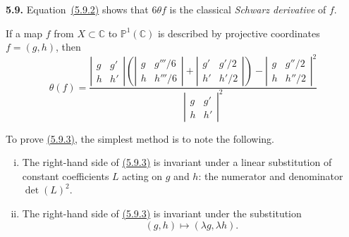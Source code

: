 \documentclass{report}
\newenvironment{rmenv}[1]
  {\phantomsection\par\medskip\noindent\textbf{#1.}\rmfamily}
  {\medskip}
\newcommand{\PP}{\mathbb{P}}
\newcommand{\CC}{\mathbb{C}}
\newcommand{\oldpage}[1]{\marginpar{\footnotesize$\Big\vert$ \textit{p.~#1}}}
\begin{document}
\begin{rmenv}{5.9}
  Equation~\hyperref[I.5.9.2]{(5.9.2)} shows that $6\theta f$ is the classical \emph{Schwarz derivative} of $f$.

  \bigskip

  If a map $f$ from $X\subset\CC$ to $\PP^1(\CC)$ is described by projective coordinates $f=(g,h)$, then
  \[
  \label{I.5.9.3}
    \theta(f) =
    \frac{
      \left\vert
        \begin{array}{cc}
          g&g'\\h&h'
        \end{array}
      \right\vert
      \left(
        \left\vert
          \begin{array}{cc}
            g&g'''/6\\h&h'''/6
          \end{array}
        \right\vert
        +
        \left\vert
          \begin{array}{cc}
            g'&g'/2\\h'&h'/2
          \end{array}
        \right\vert
      \right)
      -
      \left\vert
        \begin{array}{cc}
          g&g''/2\\h&h''/2
        \end{array}
      \right\vert^2
    }{
      \left\vert
        \begin{array}{cc}
          g&g'\\h&h'
        \end{array}
      \right\vert^2
    }
  \tag{5.9.3}
  \]

  To prove \hyperref[I.5.9.3]{(5.9.3)}, the simplest method is to note the following.
\oldpage{34}
  \begin{enumerate}[(i)]
    \item The right-hand side of \hyperref[I.5.9.3]{(5.9.3)} is invariant under a linear substitution of constant coefficients $L$ acting on $g$ and $h$: the numerator and denominator $\det(L)^2$.
    \item The right-hand side of \hyperref[I.5.9.3]{(5.9.3)} is invariant under the substitution
      \[
        (g,h) \mapsto (\lambda g,\lambda h).
      \]


\end{enumerate}
\end{rmenv}
\end{document}
